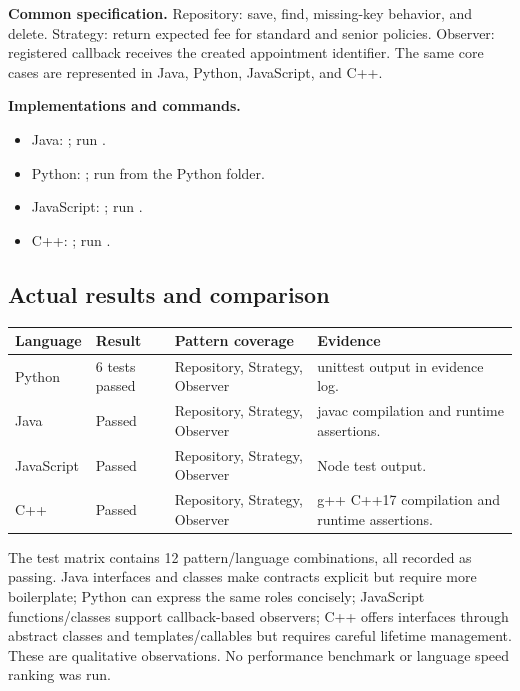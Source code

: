 \documentclass[11pt,a4paper]{article}
\begin{document}
\textbf{Common specification.} Repository: save, find, missing-key behavior, and delete. Strategy: return expected fee for standard and senior policies. Observer: registered callback receives the created appointment identifier. The same core cases are represented in Java, Python, JavaScript, and C++.

\textbf{Implementations and commands.}
\begin{itemize}
\item Java: ; run .
\item Python: ; run  from the Python folder.
\item JavaScript: ; run .
\item C++: ; run .
\end{itemize}

\subsection{Actual results and comparison}
\begin{tabularx}{\linewidth}{@{}p{1.0in}p{1.15in}p{1.25in}Y@{}}
\toprule\textbf{Language} & \textbf{Result} & \textbf{Pattern coverage} & \textbf{Evidence}\\\midrule
Python & 6 tests passed & Repository, Strategy, Observer & unittest output in evidence log.\\
Java & Passed & Repository, Strategy, Observer & javac compilation and runtime assertions.\\
JavaScript & Passed & Repository, Strategy, Observer & Node test output.\\
C++ & Passed & Repository, Strategy, Observer & g++ C++17 compilation and runtime assertions.\\
\bottomrule
\end{tabularx}

The test matrix contains 12 pattern/language combinations, all recorded as passing. Java interfaces and classes make contracts explicit but require more boilerplate; Python can express the same roles concisely; JavaScript functions/classes support callback-based observers; C++ offers interfaces through abstract classes and templates/callables but requires careful lifetime management. These are qualitative observations. No performance benchmark or language speed ranking was run.
\end{document}
